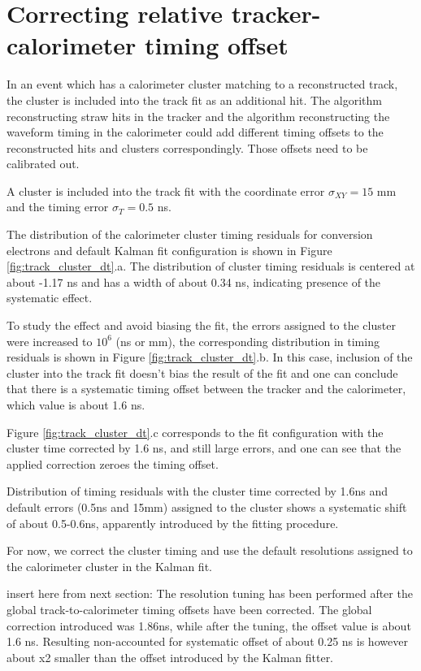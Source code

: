 \section{Correcting relative tracker-calorimeter timing offset}

In an event which has a calorimeter cluster matching to a reconstructed track, the
cluster is included into the track fit as an additional hit. The algorithm reconstructing 
straw hits in the tracker and the algorithm reconstructing the waveform timing in the calorimeter
could add different timing offsets to the reconstructed hits and clusters correspondingly.
Those offsets need to be calibrated out.

A cluster is included into the track fit with the coordinate error $\sigma_{XY} = 15$ mm
and the timing error $\sigma_T = 0.5$ ns.

The distribution of the calorimeter cluster timing residuals for conversion electrons and default Kalman fit 
configuration is shown in Figure \ref{fig:track_cluster_dt}.a. The distribution of cluster timing residuals 
is centered at about -1.17 ns and has a width of about 0.34 ns, indicating presence of the systematic effect.

To study the effect and avoid biasing the fit, the errors assigned to the cluster were increased to $10^6$ (ns or mm),
the corresponding distribution in timing residuals is shown in Figure \ref{fig:track_cluster_dt}.b. 
In this case, inclusion of the cluster into the track fit doesn't bias the result of the fit and one can conclude 
that there is a systematic timing offset between the tracker and the calorimeter, which value is about 1.6 ns.

Figure \ref{fig:track_cluster_dt}.c corresponds to the fit configuration with the cluster time corrected by 1.6 ns, 
and still large errors, and one can see that the applied correction zeroes the timing offset.

Distribution of timing residuals with the cluster time corrected by 1.6ns and default errors (0.5ns and 15mm) 
assigned to the cluster shows a systematic shift of about 0.5-0.6ns, apparently introduced by the fitting procedure.

For now, we correct the cluster timing and use the default resolutions assigned to the calorimeter cluster 
in the Kalman fit.

{\red insert here from next section:
The resolution tuning has been performed after the global track-to-calorimeter timing offsets
have been corrected. The global correction introduced was 1.86ns, while after the tuning, the offset
value is about 1.6 ns. Resulting non-accounted for systematic offset of about 0.25 ns is however
about x2 smaller than the offset introduced by the Kalman fitter. }

